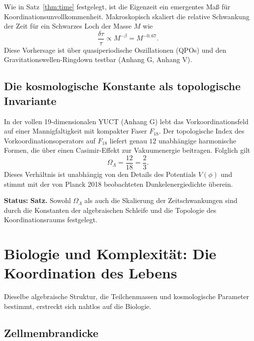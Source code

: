 \documentclass[12pt,a4paper]{article}
\begin{document}
	Wie in Satz~\ref{thm:time} festgelegt, ist die Eigenzeit ein emergentes Maß für Koordinationsunvollkommenheit. Makroskopisch skaliert die relative Schwankung der Zeit für ein Schwarzes Loch der Masse \(M\) wie
	\begin{equation}
		\boxed{\frac{\delta \tau}{\tau} \propto M^{-\beta} = M^{-0,67}}.
	\end{equation}
	Diese Vorhersage ist über quasiperiodische Oszillationen (QPOs) und den Gravitationswellen-Ringdown testbar (Anhang G, Anhang V).
	
	\subsection{Die kosmologische Konstante als topologische Invariante}
	
	In der vollen 19-dimensionalen YUCT (Anhang G) lebt das Vorkoordinationsfeld auf einer Mannigfaltigkeit mit kompakter Faser \(F_{18}\). Der topologische Index des Vorkoordinationsoperators auf \(F_{18}\) liefert genau \(12\) unabhängige harmonische Formen, die über einen Casimir-Effekt zur Vakuumenergie beitragen. Folglich gilt
	\begin{equation}
		\boxed{\Omega_\Lambda = \frac{12}{18} = \frac{2}{3}}.
		\label{eq:OmegaLambda}
	\end{equation}
	Dieses Verhältnis ist unabhängig von den Details des Potentials \(V(\phi)\) und stimmt mit der von Planck 2018 beobachteten Dunkelenergiedichte überein.
	
	\textbf{Status:} \textbf{Satz.} Sowohl \(\Omega_\Lambda\) als auch die Skalierung der Zeitschwankungen sind durch die Konstanten der algebraischen Schleife und die Topologie des Koordinationsraums festgelegt.
	
	\section{Biologie und Komplexität: Die Koordination des Lebens}
	\label{sec:biology}
	
	Dieselbe algebraische Struktur, die Teilchenmassen und kosmologische Parameter bestimmt, erstreckt sich nahtlos auf die Biologie.
	
	\subsection{Zellmembrandicke}
	
\end{document}
